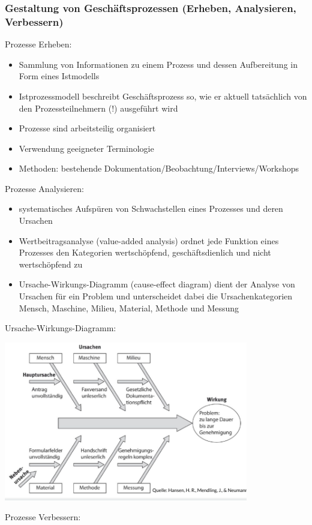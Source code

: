 \subsubsection{Gestaltung von Geschäftsprozessen (Erheben, Analysieren, Verbessern)}
Prozesse Erheben:
\begin{itemize}
  \item Sammlung von Informationen zu einem Prozess und dessen Aufbereitung in Form eines Istmodells
  \item Istprozessmodell beschreibt Geschäftsprozess so, wie er aktuell tatsächlich von den Prozessteilnehmern (!) ausgeführt wird
  \item Prozesse sind arbeitsteilig organisiert
  \item Verwendung geeigneter Terminologie
  \item Methoden: bestehende Dokumentation/Beobachtung/Interviews/Workshops
\end{itemize}
Prozesse Analysieren:
\begin{itemize}
  \item systematisches Aufspüren von Schwachstellen eines Prozesses und deren Ursachen
  \item Wertbeitragsanalyse (value-added analysis) ordnet jede Funktion eines Prozesses den Kategorien wertschöpfend, geschäftsdienlich und nicht wertschöpfend zu
  \item Ursache-Wirkungs-Diagramm (cause-effect diagram) dient der Analyse von Ursachen für ein Problem und unterscheidet dabei die Ursachenkategorien Mensch, Maschine, Milieu, Material, Methode und Messung
\end{itemize}
Ursache-Wirkungs-Diagramm:
\par
\includegraphics[width=0.8\textwidth]{assets/UrsacheWirkungDIa.PNG}
\par
Prozesse Verbessern:

